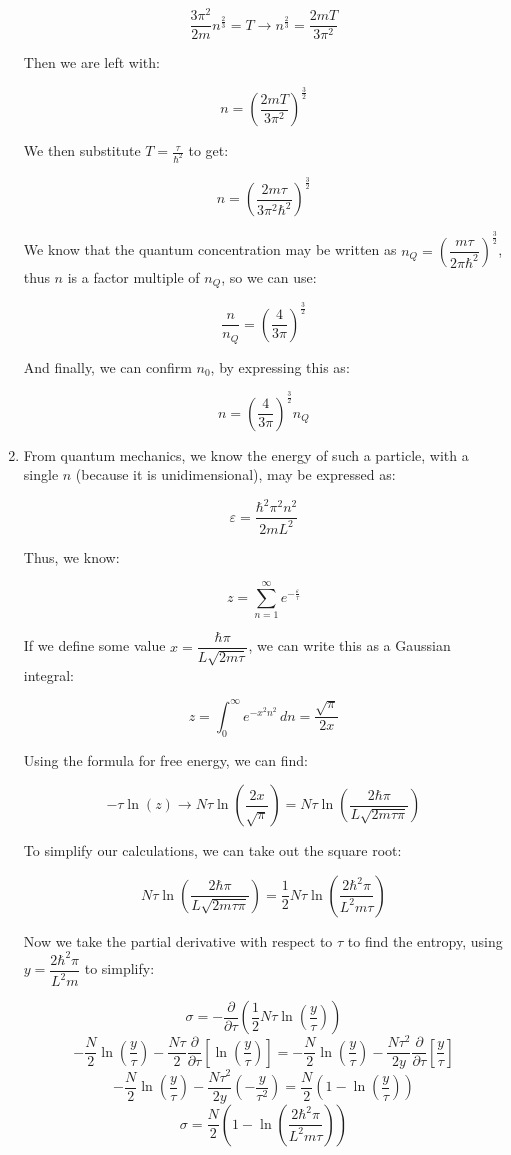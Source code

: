 \begin{enumerate}
    $$\frac{3\pi^2}{2m}n^{\frac{2}{3}}=T\rightarrow n^{\frac{2}{3}}=\frac{2mT}{3\pi^2}$$

    Then we are left with:

    $$n=\left( \frac{2mT}{3\pi^2} \right)^\frac{3}{2}$$

    We then substitute $T=\frac{\tau}{\hbar^2}$ to get:

    $$n=\left( \frac{2m\tau}{3\pi^2\hbar^2} \right)^{\frac{3}{2}}$$

    We know that the quantum concentration may be written as $n_Q=\left(\dfrac{m\tau}{2\pi\hbar^2}\right)^{\frac{3}{2}}$, thus $n$ is a factor multiple of $n_Q$, so we can use:

    $$\frac{n}{n_Q}=\left( \frac{4}{3\pi} \right)^{\frac{3}{2}}$$

    And finally, we can confirm $n_0$, by expressing this as:

    $$\boxed{n=\left( \frac{4}{3\pi} \right)^{\frac{3}{2}}n_Q}$$

    \setcounter{enumi}{10}

  \item

    From quantum mechanics, we know the energy of such a particle, with a single $n$ (because it is unidimensional), may be expressed as:

    $$\varepsilon=\frac{\hbar^2\pi^2n^2}{2mL^2}$$

    Thus, we know:

    $$z=\sum_{n=1}^{\infty} e^{-\frac{\varepsilon}{\tau}}$$

    If we define some value $x=\dfrac{\hbar\pi}{L\sqrt{2m\tau}}$, we can write this as a Gaussian integral:

    $$z=\int_0^{\infty} e^{-x^2n^2}\,dn=\frac{\sqrt{\pi}}{2x}$$

    Using the formula for free energy, we can find:

    $$-\tau\ln\left(z\right)\rightarrow N\tau\ln\left(\frac{2x}{\sqrt{\pi}}\right)=N\tau\ln\left( \frac{2\hbar\pi}{L\sqrt{2m\tau\pi}}\right)$$
    
    To simplify our calculations, we can take out the square root:

    $$N\tau\ln\left( \frac{2\hbar\pi}{L\sqrt{2m\tau\pi}}\right)=\frac{1}{2}N\tau\ln\left( \frac{2\hbar^2\pi}{L^2m\tau}\right)$$

    Now we take the partial derivative with respect to $\tau$ to find the entropy, using $y=\dfrac{2\hbar^2\pi}{L^2m}$ to simplify:

    $$\sigma=-\frac{\partial}{\partial \tau}\left( \frac{1}{2}N\tau\ln\left( \frac{y}{\tau} \right) \right)$$
    $$-\frac{N}{2}\ln\left( \frac{y}{\tau} \right)-\frac{N\tau}{2}\frac{\partial}{\partial\tau}\left[\ln\left( \frac{y}{\tau} \right)\right]=-\frac{N}{2}\ln\left( \frac{y}{\tau} \right)-\frac{N\tau^2}{2y}\frac{\partial}{\partial\tau}\left[ \frac{y}{\tau} \right]$$
    $$-\frac{N}{2}\ln\left( \frac{y}{\tau} \right)-\frac{N\tau^2}{2y}\left(-\frac{y}{\tau^2}\right)=\frac{N}{2}\left( 1-\ln\left( \frac{y}{\tau} \right) \right)$$
    $$\boxed{\sigma=\frac{N}{2}\left( 1-\ln\left( \frac{2\hbar^2\pi}{L^2m\tau} \right) \right)}$$

\end{enumerate}



